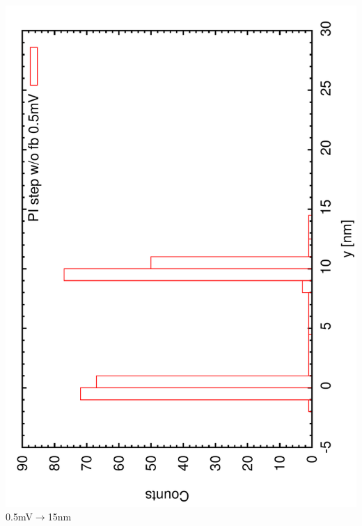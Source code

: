 \documentclass[a4paper,11pt]{book}
\begin{document}
\includegraphics[angle=-90,scale=0.20]{imagestep21a.pdf}\\
{\scriptsize 0.5mV$\rightarrow$15nm}\\
\end{document}
